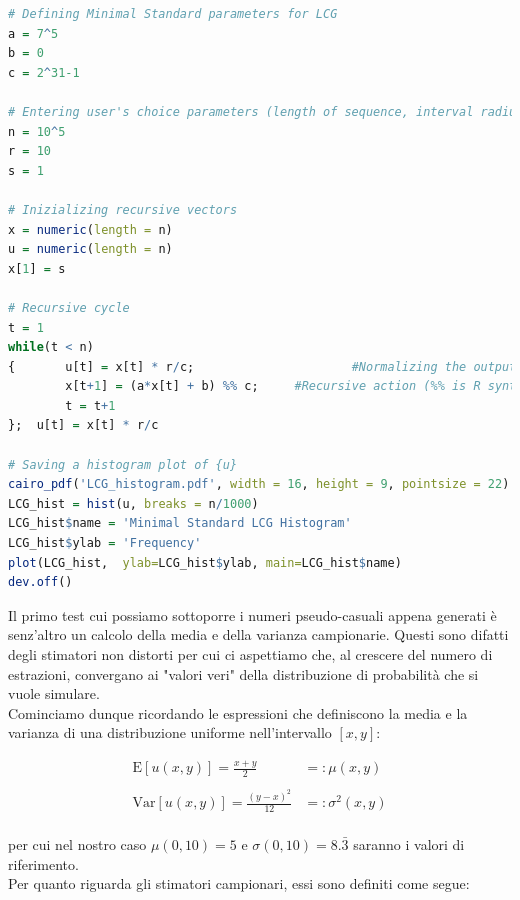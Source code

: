 \newpage

\begin{lstlisting}[language=R, style=Rstyle, caption=\texttt{R} code for Minimal Standard LCG, xleftmargin=.02\textwidth]
# Defining Minimal Standard parameters for LCG
a = 7^5
b = 0
c = 2^31-1

# Entering user's choice parameters (length of sequence, interval radius and seed)
n = 10^5
r = 10
s = 1
	
# Inizializing recursive vectors
x = numeric(length = n)
u = numeric(length = n)
x[1] = s

# Recursive cycle
t = 1
while(t < n)
{		u[t] = x[t] * r/c; 						#Normalizing the output
		x[t+1] = (a*x[t] + b) %% c;		#Recursive action (%% is R syntax for mod)
		t = t+1
};  u[t] = x[t] * r/c 
	
# Saving a histogram plot of {u}
cairo_pdf('LCG_histogram.pdf', width = 16, height = 9, pointsize = 22)
LCG_hist = hist(u, breaks = n/1000)
LCG_hist$name = 'Minimal Standard LCG Histogram'
LCG_hist$ylab = 'Frequency'
plot(LCG_hist,  ylab=LCG_hist$ylab, main=LCG_hist$name)
dev.off()
\end{lstlisting}

\bigskip

\noindent Il primo test cui possiamo sottoporre i numeri pseudo-casuali appena generati è senz'altro un calcolo della media e della varianza campionarie. Questi sono difatti degli stimatori non distorti per cui ci aspettiamo che,  al crescere del numero di estrazioni, convergano ai "valori veri" della distribuzione di probabilità che si vuole simulare.\\

\noindent Cominciamo dunque ricordando le espressioni che definiscono la media e la varianza di una distribuzione uniforme nell'intervallo $[x,y]$:

\begin{align*}
\mathrm{E}[u(x,y)] =  \frac{x+y}{2} &=: \mu(x,y)\\ \\
\mathrm{Var}[u(x,y)] = \frac{(y-x)^2}{12} &=: \sigma^2(x,y)\\
\end{align*}

\noindent per cui nel nostro caso $\mu(0,10)=5$ e $\sigma(0,10) = 8.\bar{3}$ saranno i valori di riferimento.\\

\noindent Per quanto riguarda gli stimatori campionari, essi sono definiti come segue:

